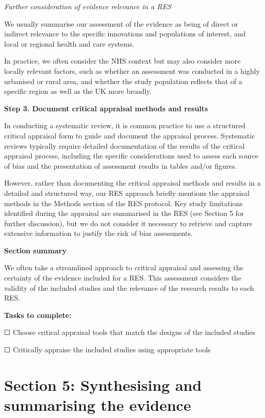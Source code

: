 \documentclass[
  letterpaper,
  DIV=11,
  numbers=noendperiod]{scrreprt}
\begin{document}
\emph{Further consideration of evidence relevance in a RES}

We usually summarise our assessment of the evidence as being of direct
or indirect relevance to the specific innovations and populations of
interest, and local or regional health and care systems.

In practice, we often consider the NHS context but may also consider
more locally relevant factors, such as whether an assessment was
conducted in a highly urbanised or rural area, and whether the study
population reflects that of a specific region as well as the UK more
broadly.

\textbf{Step 3. Document critical appraisal methods and results}

In conducting a systematic review, it is common practice to use a
structured critical appraisal form to guide and document the appraisal
process. Systematic reviews typically require detailed documentation of
the results of the critical appraisal process, including the specific
considerations used to assess each source of bias and the presentation
of assessment results in tables and/or figures.

However, rather than documenting the critical appraisal methods and
results in a detailed and structured way, our RES approach briefly
mentions the appraisal methods in the Methods section of the RES
protocol. Key study limitations identified during the appraisal are
summarised in the RES (see Section 5 for further discussion), but we do
not consider it necessary to retrieve and capture extensive information
to justify the risk of bias assessments.

\textbf{Section summary}

We often take a streamlined approach to critical appraisal and assessing
the certainty of the evidence included for a RES. This assessment
considers the validity of the included studies and the relevance of the
research results to each RES.

\textbf{Tasks to complete:}

☐ Choose critical appraisal tools that match the designs of the included
studies

☐ Critically appraise the included studies using appropriate tools


\chapter{Section 5: Synthesising and summarising the
evidence}\label{section-5-synthesising-and-summarising-the-evidence}
\end{document}
